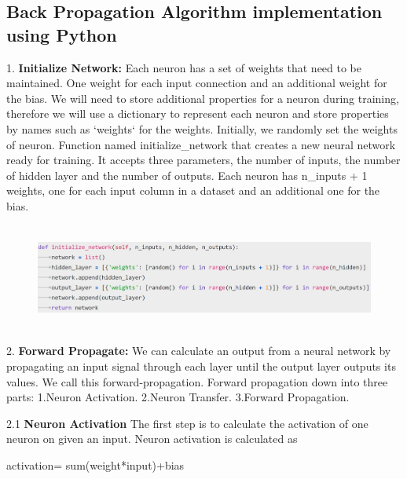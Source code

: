 \subsection{Back Propagation Algorithm implementation using Python}

1. \textbf{Initialize Network:}
Each neuron has a set of weights that need to be maintained. One weight for each input connection and an additional weight for the bias. We will need to store additional properties for a neuron during training, therefore we will use a dictionary to represent each neuron and store properties by names such as ‘weights‘ for the weights.
Initially, we randomly set the weights of neuron.\newline
Function named initialize\_network that creates a new neural network ready for training. It accepts three parameters, the number of inputs, the number of  hidden layer and the number of outputs.\newline
Each neuron  has n\_inputs + 1 weights, one for each input column in a dataset and an additional one for the bias.

\begin{figure}[H]
\begin{center}
\includegraphics[width=160mm,height=35mm]{backexplain/initializeNetwork.jpg}
\end{center}
\end{figure}

2. \textbf{Forward Propagate:}
We can calculate an output from a neural network by propagating an input signal through each layer until the output layer outputs its values.
We call this forward-propagation.\newline
Forward propagation down into three parts:\newline
    1.Neuron Activation.\newline
    2.Neuron Transfer.\newline
    3.Forward Propagation.\newline
    
2.1 \textbf{Neuron Activation}
The first step is to calculate the activation of one neuron on given an input.\newline
Neuron activation is calculated as\newline
           \centerline{activation= sum(weight*input)+bias }

